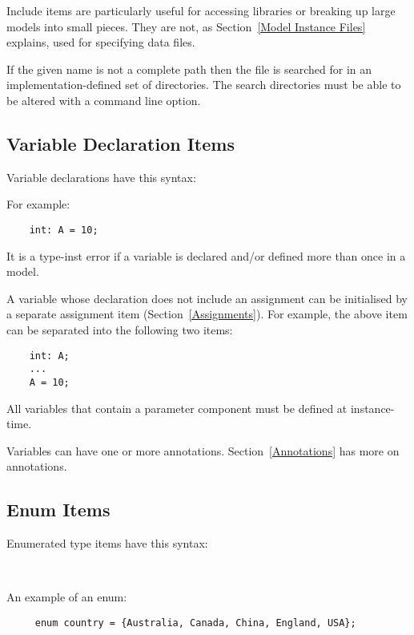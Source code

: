 \documentclass[10pt]{scrartcl}
\begin{document}
Include items are particularly useful for accessing libraries or breaking up
large models into small pieces.  They are not, as Section~\ref{Model
Instance Files} explains, used for specifying data files.

If the given name is not a complete path then the file is searched for in an
implementation-defined set of directories.  The search directories must be
able to be altered with a command line option.

\subsection{Variable Declaration Items}
     \label{Declarations}
Variable declarations have this syntax:
\begin{productions}
    \RuleVarDeclItem
\end{productions}
For example:
\begin{verbatim}
    int: A = 10;
\end{verbatim}

It is a type-inst error if a variable is declared and/or defined more than
once in a model.

A variable whose declaration does not include an assignment can be
initialised by a separate assignment item (Section~\ref{Assignments}).  For
example, the above item can be separated into the following two items:
\begin{verbatim}
    int: A;
    ...
    A = 10;
\end{verbatim}

All variables that contain a parameter component must be defined at
instance-time.

Variables can have one or more annotations.
Section~\ref{Annotations} has more on annotations.

\subsection{Enum Items}
     \label{Enum Items}
Enumerated type items have this syntax:
\begin{productions}
    \RuleEnumItem \\
    \RuleEnumCases
\end{productions}
An example of an enum:
\begin{verbatim}
     enum country = {Australia, Canada, China, England, USA};
\end{verbatim}
\end{document}
